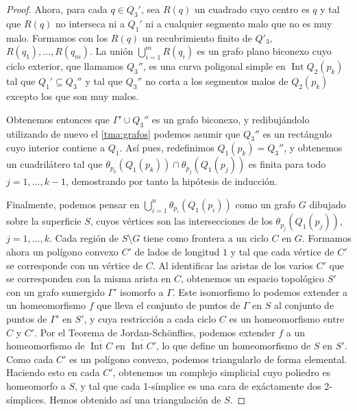 \documentclass[10pt]{report}
\DeclareMathOperator{\interior}{Int} %
\theoremstyle{definition}
\begin{document}
\begin{proof}
Ahora, para cada $q\in Q_3'$, sea $R(q)$ un cuadrado cuyo centro es $q$ y tal que $R(q)$ no interseca ni a $Q_1'$ ni a cualquier segmento malo que no es muy malo. Formamos con los $R(q)$ un recubrimiento finito de $Q'_3$, $R(q_1), \dots ,R(q_m)$. La unión $\bigcup_{i=1}^m R(q_i)$ es un grafo plano biconexo cuyo ciclo exterior, que llamamos $Q_3''$, es una curva poligonal simple en $\interior{Q_2(p_k)}$ tal que $Q_1' \subseteq Q_3''$ y tal que $Q_3''$ no corta a los segmentos malos de $Q_2(p_k)$ excepto los que son muy malos.

Obtenemos entonces que $\Gamma' \cup Q_3'' $ es un grafo biconexo, y redibujándolo utilizando de nuevo el \autoref{tma:grafos} podemos asumir que $Q_3''$ es un rectángulo cuyo interior contiene a $Q_1$. Así pues, redefinimos $Q_1 (p_k) = Q_3''$, y obtenemos un cuadrilátero tal que $\theta_{p_k} (Q_1(p_k)) \cap \theta_{p_j} (Q_1 (p_j))$ es finita para todo $j=1, \dots , k-1$, demostrando por tanto la hipótesis de inducción.

Finalmente, podemos pensar en $\bigcup_{i=1}^n \theta_{p_i} (Q_1 (p_i))$ como un grafo $G$ dibujado sobre la superficie $S$, cuyos vértices son las intersecciones de los $\theta_{p_j} (Q_1(p_j))$, $j=1, \dots ,k$. Cada región de $S\setminus G$ tiene como frontera a un ciclo $C$ en $G$. Formamos ahora un polígono convexo $C'$ de lados de longitud $1$ y tal que cada vértice de $C'$ se corresponde con un vértice de $C$. Al identificar las aristas de los varios $C'$ que se corresponden con la misma arista en $C$, obtenemos un espacio topológico $S'$ con un grafo sumergido $\Gamma'$ isomorfo a $\Gamma$. Este isomorfismo lo podemos extender a un homeomorfismo $f$ que lleva el conjunto de puntos de $\Gamma$ en $S$ al conjunto de puntos de $\Gamma'$ en $S'$, y cuya restricción a cada ciclo $C$ es un homeomorfismo entre $C$ y $C'$. Por el Teorema de Jordan-Schönflies, podemos extender $f$ a un homeomorfismo de $\overline{\interior{C}}$ en $\overline{\interior{C'}}$, lo que define un homeomorfismo de $S$ en $S'$.
Como cada $C'$ es un polígono convexo, podemos triangularlo de forma elemental. Haciendo esto en cada $C'$, obtenemos un complejo simplicial cuyo poliedro es homeomorfo a $S$, y tal que cada 1-símplice es una cara de exáctamente dos 2-símplices. Hemos obtenido así una triangulación de $S$.


\end{proof}
\end{document}
